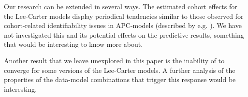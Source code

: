\newpar Our research can be extended in several ways. The estimated cohort effects for the Lee-Carter models display periodical tendencies similar to those observed for cohort-related identifiability issues in APC-models (described by e.g. \textcite{RieblerThesis2010}). We have not investigated this and its potential effects on the predictive results, something that would be interesting to know more about. 

\newpar Another result that we leave unexplored in this paper is the inability of \inlabru to converge for some versions of the Lee-Carter models. A further analysis of the properties of the data-model combinations that trigger this response would be interesting. 

